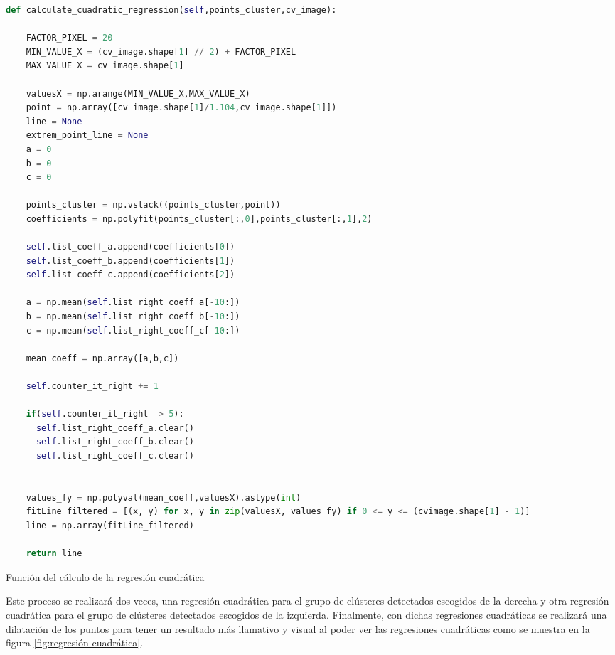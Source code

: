 \begin{code}[H]
  \begin{lstlisting}[language=Python]
    def calculate_cuadratic_regression(self,points_cluster,cv_image):

    FACTOR_PIXEL = 20
    MIN_VALUE_X = (cv_image.shape[1] // 2) + FACTOR_PIXEL
    MAX_VALUE_X = cv_image.shape[1]
  
    valuesX = np.arange(MIN_VALUE_X,MAX_VALUE_X) 
    point = np.array([cv_image.shape[1]/1.104,cv_image.shape[1]])
    line = None
    extrem_point_line = None
    a = 0
    b = 0
    c = 0

    points_cluster = np.vstack((points_cluster,point))
    coefficients = np.polyfit(points_cluster[:,0],points_cluster[:,1],2)

    self.list_coeff_a.append(coefficients[0])
    self.list_coeff_b.append(coefficients[1])
    self.list_coeff_c.append(coefficients[2])

    a = np.mean(self.list_right_coeff_a[-10:])
    b = np.mean(self.list_right_coeff_b[-10:])
    c = np.mean(self.list_right_coeff_c[-10:])

    mean_coeff = np.array([a,b,c])

    self.counter_it_right += 1

    if(self.counter_it_right  > 5):
      self.list_right_coeff_a.clear()
      self.list_right_coeff_b.clear()
      self.list_right_coeff_c.clear()  


    values_fy = np.polyval(mean_coeff,valuesX).astype(int)
    fitLine_filtered = [(x, y) for x, y in zip(valuesX, values_fy) if 0 <= y <= (cvimage.shape[1] - 1)]
    line = np.array(fitLine_filtered)
     
    return line

  \end{lstlisting}
  \caption[Función del cálculo de la regresión cuadrática]{Función del cálculo de la regresión cuadrática}
  \label{cod:codejemplo}
  \end{code}  

Este proceso se realizará dos veces, una regresión cuadrática para el grupo de clústeres detectados escogidos de la derecha y otra regresión cuadrática para el grupo de clústeres detectados
escogidos de la izquierda. \newline
Finalmente, con dichas regresiones cuadráticas se realizará una dilatación de los puntos para tener un resultado más llamativo y visual al poder
ver las regresiones cuadráticas como se muestra en la figura \ref{fig:regresión cuadrática}.\newline


